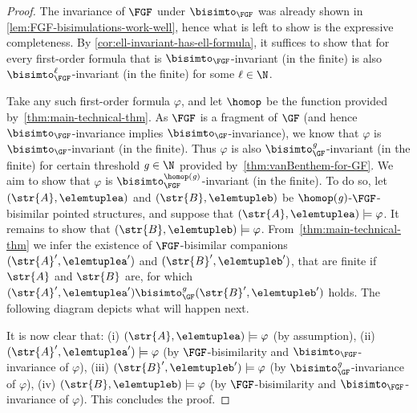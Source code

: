 \else
\begin{proof}
  The invariance of $\FGF$ under $\bisimto_{\FGF}$ was already shown in \cref{lem:FGF-bisimulations-work-well}, hence what is left to show is the expressive completeness.
By \cref{cor:ell-invariant-has-ell-formula}, it suffices to show that for every first-order formula that is $\bisimto_{\FGF}$-invariant (in the finite) is also $\bisimto_{\FGF}^{\ell}$-invariant (in the finite) for some $\ell \in \N$.

Take any such first-order formula $\varphi$, and let $\homop$ be the function provided by~\cref{thm:main-technical-thm}.
As $\FGF$ is a fragment of $\GF$ (and hence $\bisimto_{\FGF}$-invariance implies $\bisimto_{\GF}$-invariance), we know that $\varphi$ is $\bisimto_{\GF}$-invariant (in the finite).
Thus $\varphi$ is also $\bisimto_{\GF}^{\mathit{g}}$-invariant (in the finite) for certain threshold $\mathit{g} \in \N$ provided by~\cref{thm:vanBenthem-for-GF}.
We aim to show that $\varphi$ is $\bisimto_{\FGF}^{\homop(\mathit{g})}$-invariant (in the finite).
To do so, let $(\str{A}, \elemtuplea)$ and $(\str{B}, \elemtupleb)$ be $\homop(\mathit{g})$-$\FGF$-bisimilar pointed structures, and suppose that $(\str{A}, \elemtuplea) \models \varphi$. It remains to show that $(\str{B}, \elemtupleb) \models \varphi$.
From~\cref{thm:main-technical-thm} we infer the existence of $\FGF$-bisimilar companions $(\str{A}', \elemtuplea')$ and $(\str{B}', \elemtupleb')$, that are finite if $\str{A}$ and $\str{B}$ are, for which $(\str{A}', \elemtuplea') \bisimto^{\mathit{g}}_{\GF} (\str{B}', \elemtupleb')$ holds.
The following diagram depicts what will happen next.
\begin{figure}[H]
  \centering
  \usebox{\diagupgrading}
\end{figure}

It is now clear that:
(i) $(\str{A}, \elemtuplea) \models \varphi$ (by assumption),
(ii) $(\str{A}', \elemtuplea') \models \varphi$ (by $\FGF$-bisimilarity and $\bisimto_{\FGF}$-invariance of $\varphi$),
(iii) $(\str{B}', \elemtupleb') \models \varphi$ (by $\bisimto_{\GF}^{\mathit{g}}$-invariance of $\varphi$),
(iv) $(\str{B}, \elemtupleb) \models \varphi$ (by $\FGF$-bisimilarity and $\bisimto_{\FGF}$-invariance of $\varphi$).
This concludes the proof.
\end{proof}
\fi
